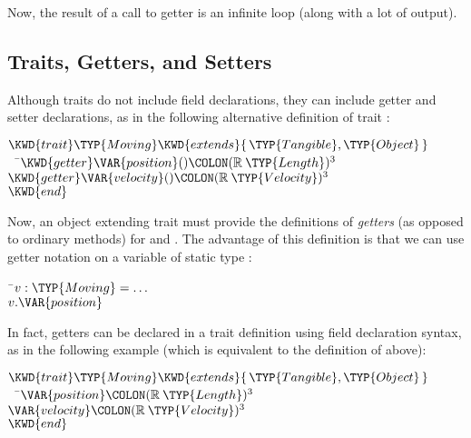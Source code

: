 Now, the result of a call to getter  is an infinite loop (along with a lot of output).

\subsection{Traits, Getters, and Setters}
Although traits do not include field declarations, they can include getter and setter declarations, as in the following
alternative definition of trait :

\begin{Fortress}
\(\KWD{trait} \TYP{Moving} \KWD{extends} \{\,\TYP{Tangible}, \TYP{Object}\,\}\)\\
{\tt~~}\pushtabs\=\+\(  \KWD{getter} \VAR{position}()\COLON (\mathbb{R}\mskip 4mu plus 4mu\TYP{Length})^{3}\)\\
\(  \KWD{getter} \VAR{velocity}()\COLON (\mathbb{R}\mskip 4mu plus 4mu\TYP{Velocity})^{3}\)\-\\\poptabs
\(\KWD{end}\)
\end{Fortress}

Now, an object extending trait  must provide the definitions of
\emph{getters} (as opposed to ordinary methods)
for  and .
The advantage of this definition is that we can use getter
notation on a variable of static type :

\begin{Fortress}
{\tt~}\pushtabs\=\+\( v \mathrel{\mathtt{:}} \TYP{Moving} = \ldots\)\\
\( v.\VAR{position}\)\-\\\poptabs
\end{Fortress}

In fact, getters can be declared in a trait definition using field declaration syntax, as in the following example
(which is equivalent to the definition of  above):

\begin{Fortress}
\(\KWD{trait} \TYP{Moving} \KWD{extends} \{\,\TYP{Tangible}, \TYP{Object}\,\}\)\\
{\tt~~}\pushtabs\=\+\(  \VAR{position}\COLON (\mathbb{R}\mskip 4mu plus 4mu\TYP{Length})^{3}\)\\
\(  \VAR{velocity}\COLON (\mathbb{R}\mskip 4mu plus 4mu\TYP{Velocity})^{3}\)\-\\\poptabs
\(\KWD{end}\)
\end{Fortress}

